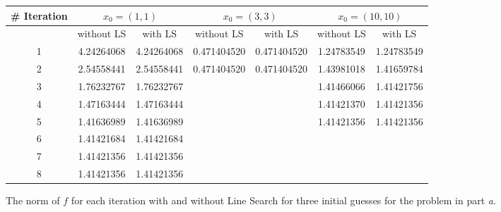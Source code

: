 \begin{figure}[tbh]
 \centering
\begin{tabular}{ |c || c|c || c|c ||   c|c|}
 \hline
 \# Iteration  &\multicolumn{2}{|c||}{$x_{0}=(1,1)$} & \multicolumn{2}{|c||}{$x_{0}=(3,3)$} & \multicolumn{2}{|c|}{ $x_{0}=(10,10)$}\\ 
  \hline
 	& without LS & with LS & without LS & with LS & without LS & with LS\\
  \hhline{|=|=|=|=|=|=|=|}  
 1  &4.24264068	&4.24264068 &0.471404520 &0.471404520 &1.24783549 &1.24783549 \\
   \hline                                                                    
 2  &2.54558441	&2.54558441 &0.471404520 &0.471404520 &1.43981018 &1.41659784 \\
   \hline                                                                    
 3  &1.76232767	&1.76232767 &            &            &1.41466066 &1.41421756 \\
   \hline                                                                    
 4  &1.47163444	&1.47163444 &            &            &1.41421370 &1.41421356 \\
   \hline                                                                    
 5  &1.41636989	&1.41636989 &            &            &1.41421356 &1.41421356 \\
   \hline                                            
 6  &1.41421684	&1.41421684 &            &            &           &          \\
   \hline                                                                    
 7  &1.41421356	&1.41421356 &            &            &           &          \\
   \hline                                                                    
 8  &1.41421356  &1.41421356 &            &            &           &          \\
   \hline
\end{tabular} 
  \caption{The norm of $f$ for each iteration with and without Line Search for three initial guesses for the problem in part \emph{a}.}
   \label{tab:part_a}
\end{figure} 



